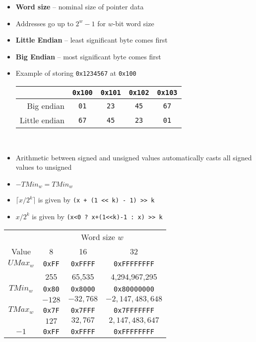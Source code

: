 \documentclass[twocolumn]{article}
\renewcommand{\tt}[1]{\texttt{#1}}
\begin{document}
\begin{itemize}[noitemsep]
    \item \textbf{Word size} -- nominal size of pointer data
    \item Addresses go up to $2^w - 1$ for $w$-bit word size
    \item \textbf{Little Endian} -- least significant byte comes first
    \item \textbf{Big Endian} -- most significant byte comes first
    \item Example of storing \tt{0x1234567} at \tt{0x100} \\
    \begin{tabular}{| r || c | c | c | c |}
        \hline
                      & \tt{0x100} & \tt{0x101} & \tt{0x102} & \tt{0x103} \\ \hline
        Big endian    & \tt{01}    & \tt{23}    & \tt{45}    & \tt{67}    \\ \hline
        Little endian & \tt{67}    & \tt{45}    & \tt{23}    & \tt{01}    \\ \hline
    \end{tabular} \\
    \item Arithmetic between signed and unsigned values automatically casts all signed values to unsigned
    \item $-TMin_w = TMin_w$
    \item $\lceil x/2^k \rceil$ is given by \tt{(x + (1 << k) - 1) >> k}
    \item $x/2^k$ is given by \tt{(x<0 ? x+(1<<k)-1 : x) >> k}
\end{itemize}

\begin{tabular}{| c || c | c | c |}
    \hline
    & \multicolumn{3}{c|}{Word size $w$} \\ \cline{2-4}
    Value & 8 & 16 & 32 \\ \hline
    $UMax_w$ & \tt{0xFF} & \tt{0xFFFF} & \tt{0xFFFFFFFF} \\
    & 255 & 65,535 & 4,294,967,295 \\ \hline
    $TMin_w$ & \tt{0x80} & \tt{0x8000} & \tt{0x80000000} \\
    & $-128$ & $-32,768$ & $-2,147,483,648$ \\ \hline
    $TMax_w$ & \tt{0x7F} & \tt{0x7FFF} & \tt{0x7FFFFFFF} \\
    & $127$ & $32,767$ & $2,147,483,647$ \\ \hline
    $-1$ & \tt{0xFF} & \tt{0xFFFF} & \tt{0xFFFFFFFF} \\ \hline
\end{tabular}
\end{document}
